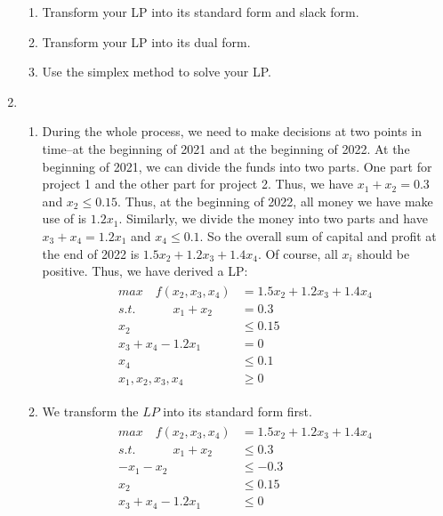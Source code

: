 \documentclass[12pt,a4paper]{article}
\makeatletter
\newtheorem*{solution}{Solution}
\theoremstyle{definition}
\renewenvironment{solution}[1][Solution] {\par\pushQED{\qed}\normalfont\topsep6\p@\@plus6\p@\relax\trivlist\item[\hskip\labelsep\bfseries#1\@addpunct{.}]\ignorespaces}{\popQED\endtrivlist\@endpefalse} \makeatother
\makeatother
\begin{document}
\begin{enumerate}
\begin{enumerate}
    \item
    Transform your LP into its standard form and slack form.

    \item
    Transform your LP into its dual form.

    \item
    Use the simplex method to solve your LP.
    \end{enumerate}
    \begin{solution}
    ~
    \begin{enumerate}
        \item 
        During the whole process, we need to make decisions at two points in time--at the beginning of 2021 and at the beginning of 2022. At the beginning of 2021, we can divide the funds into two parts. One part for project 1 and the other part for project 2. Thus, we have $x_1+x_2 = 0.3$ and $x_2\leq 0.15$. Thus, at the beginning of 2022, all money we have make use of is $1.2x_1$. Similarly, we divide the money into two parts and have $x_3+x_4 = 1.2x_1$ and $x_4\leq 0.1$. So the overall sum of capital and profit at the end of 2022 is $1.5 x_2 + 1.2x_3+1.4x_4$. Of course, all $x_i$ should be positive. Thus, we have derived a LP:
        \begin{align*}
            \begin{split}
                max \quad f(x_2,x_3,x_4) &= 1.5 x_2 + 1.2x_3+1.4x_4\\
                s.t.\quad\quad\quad x_1+x_2 &= 0.3\\
                x_2 &\leq 0.15\\
                x_3+x_4 - 1.2x_1&= 0\\
                x_4 &\leq 0.1\\
                x_1,x_2,x_3,x_4&\ge 0
            \end{split}
        \end{align*}
        \item
        We transform the $LP$ into its standard form first.
        \begin{align*}
            \begin{split}
                max \quad f(x_2,x_3,x_4) &= 1.5 x_2 + 1.2x_3+1.4x_4\\
                s.t.\quad\quad\quad x_1+x_2 &\leq 0.3\\
                -x_1-x_2 &\leq -0.3\\
                x_2 &\leq 0.15\\
                x_3+x_4 -1.2x_1&\leq 0\\

\end{split}
\end{align*}
\end{enumerate}
\end{solution}
\end{enumerate}
\end{document}
